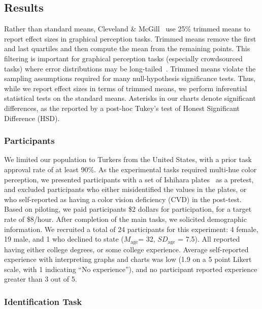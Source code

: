 \documentclass{vgtc}                          %
\begin{document}
\subsection{Results}

Rather than standard means, Cleveland \& McGill~\cite{cleveland1984graphical} use 25\% trimmed means to report effect sizes in graphical perception tasks. Trimmed means remove the first and last quartiles and then compute the mean from the remaining points. This filtering is important for graphical perception tasks (especially crowdsourced tasks) where error distributions may be long-tailed~\cite{heer2010crowdsourcing}. Trimmed means violate the sampling assumptions required for many null-hypothesis significance tests. Thus, while we report effect sizes in terms of trimmed means, we perform inferential statistical tests on the standard means. Asterisks in our charts denote significant differences, as the reported by a post-hoc Tukey's test of Honest Significant Difference (HSD). 

\subsubsection{Participants}

We limited our population to Turkers from the United States, with a prior task approval rate of at least 90\%. As the experimental tasks required multi-hue color perception, we presented participants with a set of Ishihara plates~\cite{hardy1945tests} as a pretest, and excluded participants who either misidentified the values in the plates, or who self-reported as having a color vision deficiency (CVD) in the post-test. Based on piloting, we paid participants \$2 dollars for participation, for a target rate of \$8/hour. After completion of the main tasks, we solicited demographic information. We recruited a total of 24 participants for this experiment: 4 female, 19 male, and 1 who declined to state ($M_{\text{age}}$= 32, $SD_{\text{age}}$ = 7.5). All reported having either college degrees, or some college experience. Average self-reported experience with interpreting graphs and charts was low (1.9 on a 5 point Likert scale, with 1 indicating ``No experience''), and no participant reported experience greater than 3 out of 5.

\subsubsection{Identification Task}
\accuracyFig
\responseTimeFig
\end{document}
